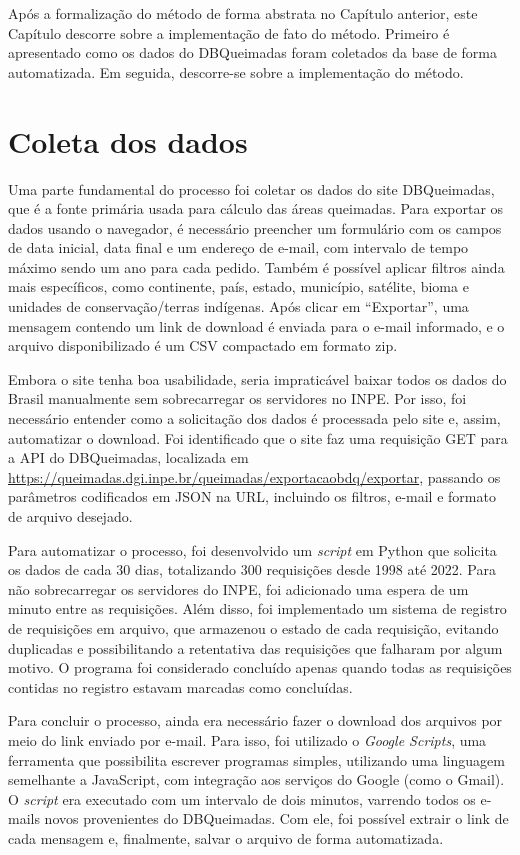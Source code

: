 \documentclass[cic,tc]{iiufrgs}
\begin{document}
Após a formalização do método de forma abstrata no Capítulo anterior, este Capítulo descorre sobre a implementação de fato do método. Primeiro é apresentado como os dados do DBQueimadas foram coletados da base de forma automatizada. Em seguida, descorre-se sobre a implementação do método.

\section{Coleta dos dados}

Uma parte fundamental do processo foi coletar os dados do site DBQueimadas, que é a fonte primária usada para cálculo das áreas queimadas. Para exportar os dados usando o navegador, é necessário preencher um formulário com os campos de data inicial, data final e um endereço de e-mail, com intervalo de tempo máximo sendo um ano para cada pedido. Também é possível aplicar filtros ainda mais específicos, como continente, país, estado, município, satélite, bioma e unidades de conservação/terras indígenas. Após clicar em ``Exportar'', uma mensagem contendo um link de download é enviada para o e-mail informado, e o arquivo disponibilizado é um CSV compactado em formato zip.

Embora o site tenha boa usabilidade, seria impraticável baixar todos os dados do Brasil manualmente sem sobrecarregar os servidores no INPE. Por isso, foi necessário entender como a solicitação dos dados é processada pelo site e, assim, automatizar o download. Foi identificado que o site faz uma requisição GET para a API do DBQueimadas, localizada em \url{https://queimadas.dgi.inpe.br/queimadas/exportacaobdq/exportar}, passando os parâmetros codificados em JSON na URL, incluindo os filtros, e-mail e formato de arquivo desejado.

Para automatizar o processo, foi desenvolvido um \textit{script} em Python que solicita os dados de cada 30 dias, totalizando 300 requisições desde 1998 até 2022. Para não sobrecarregar os servidores do INPE, foi adicionado uma espera de um minuto entre as requisições. Além disso, foi implementado um sistema de registro de requisições em arquivo, que armazenou o estado de cada requisição, evitando duplicadas e possibilitando a retentativa das requisições que falharam por algum motivo. O programa foi considerado concluído apenas quando todas as requisições contidas no registro estavam marcadas como concluídas.

Para concluir o processo, ainda era necessário fazer o download dos arquivos por meio do link enviado por e-mail. Para isso, foi utilizado o \textit{Google Scripts}, uma ferramenta que possibilita escrever programas simples, utilizando uma linguagem semelhante a JavaScript, com integração aos serviços do Google (como o Gmail). O \textit{script} era executado com um intervalo de dois minutos, varrendo todos os e-mails novos provenientes do DBQueimadas. Com ele, foi possível extrair o link de cada mensagem e, finalmente, salvar o arquivo de forma automatizada. 
\end{document}
